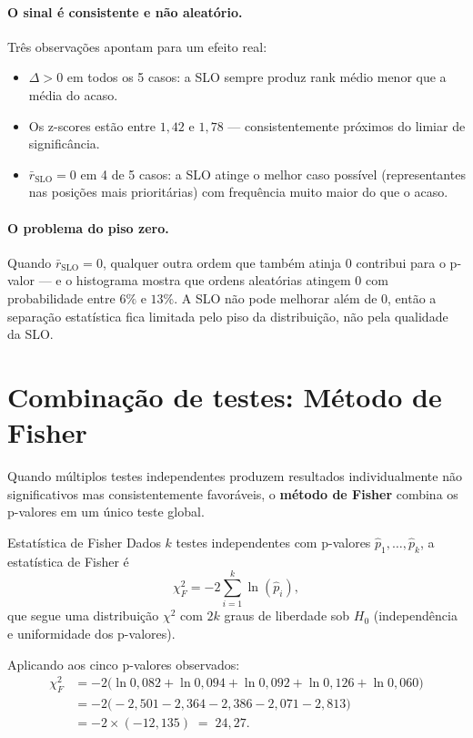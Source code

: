 \documentclass[a4paper,11pt]{article}
\begin{document}
\paragraph{O sinal é consistente e não aleatório.}
Três observações apontam para um efeito real:
\begin{itemize}
  \item $\Delta > 0$ em todos os 5 casos: a SLO sempre produz rank
    médio menor que a média do acaso.
  \item Os z-scores estão entre $1{,}42$ e $1{,}78$ — consistentemente
    próximos do limiar de significância.
  \item $\bar{r}_{\text{SLO}} = 0$ em 4 de 5 casos: a SLO atinge
    o melhor caso possível (representantes nas posições mais
    prioritárias) com frequência muito maior do que o acaso.
\end{itemize}

\paragraph{O problema do piso zero.}
Quando $\bar{r}_{\text{SLO}} = 0$, qualquer outra ordem que também
atinja 0 contribui para o p-valor — e o histograma mostra que ordens
aleatórias atingem 0 com probabilidade entre $6\%$ e $13\%$. A SLO
não pode melhorar além de 0, então a separação estatística fica
limitada pelo piso da distribuição, não pela qualidade da SLO.

\section{Combinação de testes: Método de Fisher}

Quando múltiplos testes independentes produzem resultados individualmente
não significativos mas consistentemente favoráveis, o
\textbf{método de Fisher} combina os p-valores em um único teste global.

\begin{definicao}{Estatística de Fisher}
Dados $k$ testes independentes com p-valores $\hat{p}_1, \ldots,
\hat{p}_k$, a estatística de Fisher é
\[
  \chi^2_F = -2\sum_{i=1}^{k} \ln(\hat{p}_i),
\]
que segue uma distribuição $\chi^2$ com $2k$ graus de liberdade sob
$H_0$ (independência e uniformidade dos p-valores).
\end{definicao}

Aplicando aos cinco p-valores observados:
\begin{align*}
  \chi^2_F &= -2\bigl(\ln 0{,}082 + \ln 0{,}094 + \ln 0{,}092
               + \ln 0{,}126 + \ln 0{,}060\bigr) \\
           &= -2\bigl(-2{,}501 - 2{,}364 - 2{,}386
               - 2{,}071 - 2{,}813\bigr) \\
           &= -2 \times (-12{,}135) \;=\; 24{,}27.
\end{align*}
\end{document}
